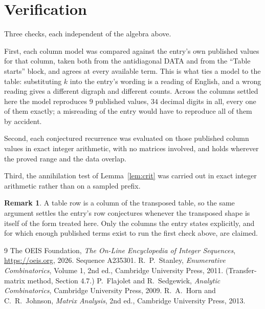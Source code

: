 \documentclass[11pt,a4paper]{article}
\theoremstyle{plain}
\theoremstyle{definition}
\newtheorem{remark}[theorem]{Remark}
\begin{document}
\section{Verification}

Three checks, each independent of the algebra above.

First, each column model was compared against the entry's own published values for that
column, taken both from the antidiagonal DATA and from the ``Table starts'' block, and agrees
at every available term. This is what ties a model to the table: substituting $k$ into the
entry's wording is a reading of English, and a wrong reading gives a different digraph and
different counts. Across the columns settled here the model reproduces $9$ published
values, $34$ decimal digits in all, every one of them exactly; a misreading of the entry
would have to reproduce all of them by accident.

Second, each conjectured recurrence was evaluated on those published column values in exact
integer arithmetic, with no matrices involved, and holds wherever the proved range and the
data overlap.

Third, the annihilation test of Lemma~\ref{lem:crit} was carried out in exact integer
arithmetic rather than on a sampled prefix.

\begin{remark}
A table row is a column of the transposed table, so the same argument settles the entry's row
conjectures whenever the transposed shape is itself of the form treated here. Only the columns
the entry states explicitly, and for which enough published terms exist to run the first check
above, are claimed.
\end{remark}

\begin{thebibliography}{9}
 The OEIS Foundation, \emph{The On-Line Encyclopedia of Integer
Sequences}, \url{https://oeis.org}, 2026. Sequence A235301.
 R.~P.~Stanley, \emph{Enumerative Combinatorics}, Volume 1, 2nd ed.,
Cambridge University Press, 2011. (Transfer-matrix method, Section 4.7.)
 P.~Flajolet and R.~Sedgewick, \emph{Analytic Combinatorics}, Cambridge
University Press, 2009.
 R.~A.~Horn and C.~R.~Johnson, \emph{Matrix Analysis}, 2nd ed., Cambridge
University Press, 2013.
\end{thebibliography}
\end{document}

